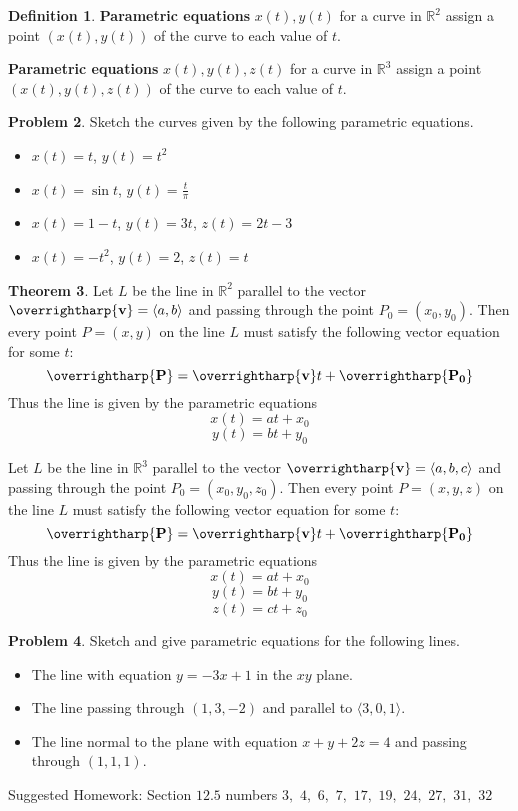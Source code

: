 \documentclass[letterpaper, twoside, 12pt]{book}
\newcommand{\<}{\langle}
\renewcommand{\>}{\rangle}
\theoremstyle{definition}
\newtheorem{theorem}{Theorem}
\theoremstyle{definition}
\newtheorem{definition}[theorem]{Definition}
\newtheorem{problem}[theorem]{Problem}
\newcommand{\harpvec}[1]{\overrightharp{\ensuremath{\mathbf{#1}}}}
\begin{document}
\vfill

\begin{definition}
  \textbf{Parametric equations} $x(t),y(t)$
  for a curve in $\mathbb R^2$ assign a point $(x(t),y(t))$ of the curve
  to each value of $t$.

  \textbf{Parametric equations} $x(t),y(t),z(t)$
  for a curve in $\mathbb R^3$ assign a point $(x(t),y(t),z(t))$ of the curve
  to each value of $t$.
\end{definition}

\newpage

\begin{problem}
  Sketch the curves given by the following parametric equations.
    \begin{itemize}
      \item $x(t)=t$, $y(t)=t^2$
      \item $x(t)=\sin t$, $y(t)=\frac{t}{\pi}$
      \item $x(t)=1-t$, $y(t)=3t$, $z(t)=2t-3$
      \item $x(t)=-t^2$, $y(t)=2$, $z(t)=t$
    \end{itemize}
\end{problem}

\vfill

\begin{theorem}
  Let $L$ be the line in $\mathbb R^2$ parallel to the vector $\harpvec v=\<a,b\>$
  and passing through the point $P_0=(x_0,y_0)$. Then every point $P=(x,y)$
  on the line $L$ must satisfy the following vector equation for some $t$:
  \[
    \harpvec{P} = \harpvec{v}t + \harpvec{P_0}
  \]
  Thus the line is given by the parametric equations
  \[
    x(t) = at + x_0
  \]
  \[
    y(t) = bt + y_0
  \]

  Let $L$ be the line in $\mathbb R^3$ parallel to the vector $\harpvec v=\<a,b,c\>$
  and passing through the point $P_0=(x_0,y_0,z_0)$. Then every point $P=(x,y,z)$
  on the line $L$ must satisfy the following vector equation for some $t$:
  \[
    \harpvec{P} = \harpvec{v}t + \harpvec{P_0}
  \]
  Thus the line is given by the parametric equations
  \[
    x(t) = at + x_0
  \]
  \[
    y(t) = bt + y_0
  \]
  \[
    z(t) = ct + z_0
  \]
\end{theorem}

\newpage

\begin{problem}
  Sketch and give parametric equations for the following lines.
    \begin{itemize}
      \item The line with equation $y=-3x+1$ in the $xy$ plane.
      \item The line passing through $(1,3,-2)$ and parallel to $\<3,0,1\>$.
      \item The line normal to the plane with equation $x+y+2z=4$ and
            passing through $(1,1,1)$.
    \end{itemize}
\end{problem}

\vfill

\noindent Suggested Homework: Section $12.5$ numbers $3,$ $4,$ $6,$ $7,$ $17,$ $19,$ $24,$ $27,$ $31,$ $32$
\end{document}
